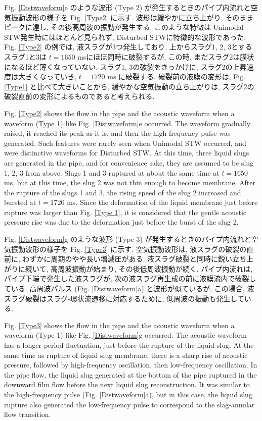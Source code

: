 \documentclass[12pt]{article}
\begin{document}
Fig. \ref{Distwaveform}e のような波形 (Type 2) が発生するときのパイプ内流れと空気振動波形の様子を Fig. \ref{Type2} に示す. 
波形は緩やかに立ち上がり, そのままピークに達し, その後高周波の振動が発生する. 
このような特徴は Unimodal STW発生時にはほとんど見られず, Disturbed STWに特徴的な波形であった. 
Fig. \ref{Type2} の例では, 液スラグが3つ発生しており, 上からスラグ1, 2, 3とする. スラグ1と3は $t=1650$ msにほぼ同時に破裂するが, この時, まだスラグ2は膜状になるほど薄くなっていない. スラグ1, 3の破裂をきっかけに, スラグ2の上昇速度は大きくなっていき, $t=1720$ ms に破裂する. 破裂前の液膜の変形は, Fig. \ref{Type1} と比べて大きいことから, 緩やかな空気振動の立ち上がりは, スラグ2の破裂直前の変形によるものであると考えられる.

Fig. \ref{Type2} shows the flow in the pipe and the acoustic waveform when a waveform (Type 1) like Fig. \ref {Distwaveform}e occurred.
The waveform gradually raised, it reached its peak as it is, and then the high-frequency pulse was generated.
Such features were rarely seen when Unimodal STW occurred, and were distinctive waveforms for Disturbed STW.
At this time, three liquid slugs are generated in the pipe, and for convenience sake, they are assumed to be slug 1, 2, 3 from above. 
Slugs 1 and 3 ruptured at about the same time at $ t = 1650 $ ms, but at this time, the slug 2 was not thin enough to become membrane.
After the rupture of the slugs 1 and 3, the rising speed of the slug 2 increased and bursted at $ t = 1720 $ ms.
Since the deformation of the liquid membrane just before rupture was larger than Fig. \ref {Type 1}, it is considered that the gentle acoustic pressure rise was due to the deformation just before the burst of the slug 2.



Fig. \ref{Distwaveform}g のような波形 (Type 3) が発生するときのパイプ内流れと空気振動波形の様子を Fig. \ref{Type3} に示す. 空気振動波形は, 液スラグの破裂の直前に, わずかに周期のやや長い増減圧がある. 
液スラグ破裂と同時に鋭い立ち上がりに続いて, 高周波振動が始まり, その後低周波振動が続く. 
パイプ内流れは, パイプ下端で発生した液スラグが, 次の液スラグ再生成の前に液膜流内で破裂している. 
高周波パルス (Fig. \ref{Distwaveform}a) と波形が似ているが, この場合, 液スラグ破裂はスラグ-環状流遷移に対応するために, 低周波の振動も発生している.


Fig. \ref{Type3} shows the flow in the pipe and the acoustic waveform when a waveform (Type 1) like Fig. \ref {Distwaveform}g occurred. 
The acoustic waveform has a longer period fluctuation, just before the rupture of the liquid slug.
At the same time as rupture of liquid slug membrane, there is a sharp rise of acoustic pressure, followed by high-frequency oscillation, then low-frequency oscillation. In the pipe flow, the liquid slug generated at the bottom of the pipe ruptured in the downward film flow before the next liquid slug reconstruction.
It was similar to the high-frequency pulse (Fig. \ref{Distwaveform}a), but in this case, the liquid slug rupture also generated the low-frequency pulse to correspond to the slag-annular flow transition.
\end{document}
